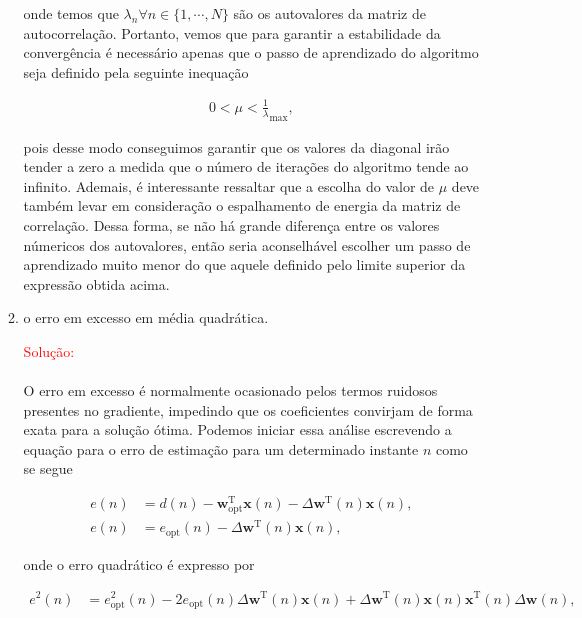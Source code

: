 \documentclass[a4paper,10pt]{article}
\begin{document}
\begin{enumerate}
\begin{enumerate}
						onde temos que $\lambda_{n} \forall n \in \{1, \cdots, N\}$ são os autovalores da matriz de autocorrelação. Portanto, vemos que para garantir a estabilidade da convergência é necessário 
						apenas que o passo de aprendizado do algoritmo seja definido pela seguinte inequação

						\begin{align}
							0 < \mu < \frac{1}{\lambda}_{\text{max}},
						\end{align}

						pois desse modo conseguimos garantir que os valores da diagonal irão tender a zero a medida que o número de iterações do algoritmo tende ao infinito. Ademais, é interessante ressaltar que a escolha 
						do valor de $\mu$ deve também levar em consideração o espalhamento de energia da matriz de correlação. Dessa forma, se não há grande diferença entre
						os valores númericos dos autovalores, então seria aconselhável escolher um passo de aprendizado muito menor do que aquele definido pelo limite superior da expressão obtida acima.
						
						\item o erro em excesso em média quadrática. 
					
						\textcolor{red}{Solução:}
						
						\paragraph{}O erro em excesso é normalmente ocasionado pelos termos ruidosos presentes no gradiente, impedindo que os coeficientes convirjam de forma exata para a solução ótima. 
						Podemos iniciar essa análise escrevendo a equação para o erro de estimação para um determinado instante $n$ como se segue

						\begin{align}
							e(n) &= d(n) - \mathbf{w}^{\text{T}}_{\text{opt}} \mathbf{x}(n) - \Delta \mathbf{w}^{\text{T}}(n) \mathbf{x}(n), \\
							e(n) &= e_{\text{opt}}(n) - \Delta \mathbf{w}^{\text{T}}(n) \mathbf{x}(n),
						\end{align}

						onde o erro quadrático é expresso por

						\begin{align}
							e^{2}(n) &= e^{2}_{\text{opt}}(n) - 2 e_{\text{opt}}(n) \Delta \mathbf{w}^{\text{T}}(n) \mathbf{x}(n) + \Delta \mathbf{w}^{\text{T}}(n) \mathbf{x}(n) \mathbf{x}^{\text{T}}(n) \Delta \mathbf{w}(n) ,
						\end{align}


\end{enumerate}
\end{enumerate}
\end{document}
